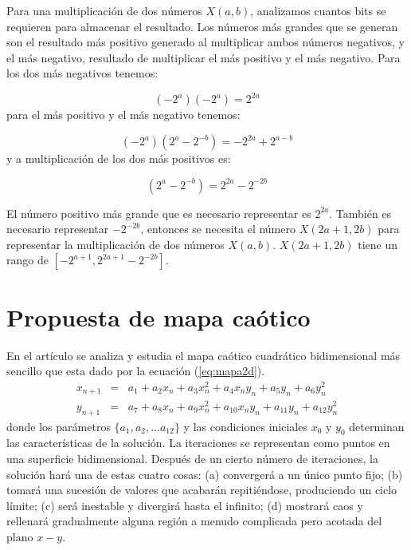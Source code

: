         Para una multiplicación de dos números $X(a,b)$, analizamos cuantos bits se requieren para almacenar el resultado. Los números más grandes que se generan son el resultado más positivo generado al multiplicar ambos números negativos, y el más negativo, resultado de multiplicar el más positivo y el más negativo. Para los dos más negativos tenemos:
        
        \begin{equation}
            (-2^{a})(-2^{a}) = 2^{2a}
        \end{equation}
        para el más positivo y el más negativo tenemos:
        
        \begin{equation}
            (-2^{a})(2^{a}-2^{-b}) = -2^{2a} + 2^{a-b}
        \end{equation}
        y a multiplicación de los dos más positivos es:

        \begin{equation}
            (2^{a} - 2^{-b}) = 2^{2a} - 2^{-2b}
        \end{equation}

        El número positivo más grande que es necesario representar es $2^{2a}$. También es necesario representar $-2^{-2b}$, entonces se necesita el número $X(2a+1,2b)$ para representar la multiplicación de dos números $X(a,b)$. $X(2a+1,2b)$ tiene un rango de $[-2^{a+1}, 2^{2a+1} - 2^{-2b}]$.

        
	\section{Propuesta de mapa caótico}
    
        En el artículo \cite{Sprott1993} se analiza y estudia el mapa caótico cuadrático bidimensional más sencillo que esta dado por la ecuación (\ref{eq:mapa2d}). 
        \begin{equation}
            \begin{array}{ccl}
                x_{n+1} & = &  a_{1} + a_{2}x_{n} + a_{3}x_{n}^{2} + a_{4}x_{n}y_{n} + a_{5}y_{n} + a_{6}y_{n}^{2}\\
                y_{n+1} & = &  a_{7} + a_{8}x_{n} + a_{9}x_{n}^{2} + a_{10}x_{n}y_{n} + a_{11}y_{n} + a_{12}y_{n}^{2}
            \end{array}
            \label{eq:mapa2d}
        \end{equation}
        donde los parámetros $\{a_{1}, a_{2}, \ldots a_{12}\}$ y las condiciones iniciales $x_{0}$ y $y_{0}$ determinan las características de la solución. La iteraciones se representan como puntos en una superficie bidimensional. Después de un cierto número de iteraciones, la solución hará una de estas cuatro cosas: (a) convergerá a un único punto fijo; (b) tomará una sucesión de valores que acabarán repitiéndose, produciendo un ciclo límite; (c) será inestable y divergirá hasta el infinito; (d) mostrará caos y rellenará gradualmente alguna región a menudo complicada pero acotada del plano $x-y$.
        
